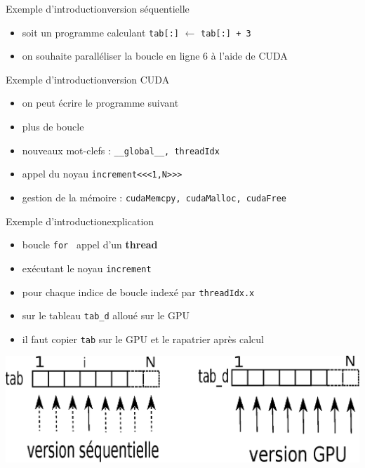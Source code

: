 \documentclass[11pt,mathserif]{beamer}
\newcommand{\gezi}{\faLongArrowRight}
\newcommand{\galde}{\faQuestion}
\newcommand{\argi}{\faLightbulbO}
\newcommand{\kontuz}{\faExclamationTriangle}
\newcommand{\pozik}{\faSmileO}
\newcommand{\adibi}{\faCommentO}
\begin{document}
\begin{frame}{Exemple d'introduction}{version séquentielle}
\pause
\begin{itemize}[<+->]
  \item[\adibi] soit un programme calculant \texttt{tab[:]} $\leftarrow$ \texttt{tab[:] + 3}

\item[\galde] on souhaite paralléliser la boucle en ligne 6 à l'aide de CUDA
\end{itemize}
\end{frame}

\begin{frame}{Exemple d'introduction}{version CUDA}
\pause
\begin{itemize}[<+->]
  \item[\adibi] on peut écrire le programme suivant

\item[\pozik] plus de boucle
\item[\argi] nouveaux mot-clefs : \texttt{\_\_global\_\_, threadIdx}
\item[\argi] appel du noyau \texttt{increment<<<1,N>>>}
\item[\argi] gestion de la mémoire : \texttt{\small cudaMemcpy, cudaMalloc, cudaFree}
\end{itemize}
\end{frame}

\begin{frame}{Exemple d'introduction}{explication}
\pause
\begin{itemize}[<+->]
 \item[\argi] boucle \texttt{for} \gezi\ appel d'un {\bf thread}
 \item[\argi] exécutant le noyau \texttt{increment}
 \item[\argi] pour chaque indice de boucle indexé par \texttt{threadIdx.x}
 \item[\argi] sur le tableau \texttt{tab\_d} alloué sur le GPU
 \item[\kontuz] il faut copier \texttt{tab} sur le GPU et le rapatrier après calcul
\end{itemize}
\pause
\begin{center}
\includegraphics[width=0.9\linewidth]{fig/parallel.eps}
\end{center}
\end{frame}
\end{document}
